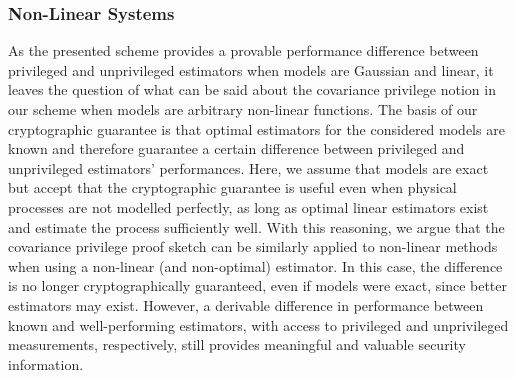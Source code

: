 
% 
% 

\subsubsection{Non-Linear Systems}
As the presented scheme provides a provable performance difference between privileged and unprivileged estimators when models are Gaussian and linear, it leaves the question of what can be said about the covariance privilege notion in our scheme when models are arbitrary non-linear functions. The basis of our cryptographic guarantee is that optimal estimators for the considered models are known and therefore guarantee a certain difference between privileged and unprivileged estimators' performances. Here, we assume that models are exact but accept that the cryptographic guarantee is useful even when physical processes are not modelled perfectly, as long as optimal linear estimators exist and estimate the process sufficiently well. With this reasoning, we argue that the covariance privilege proof sketch can be similarly applied to non-linear methods when using a non-linear (and non-optimal) estimator. In this case, the difference is no longer cryptographically guaranteed, even if models were exact, since better estimators may exist. However, a derivable difference in performance between known and well-performing estimators, with access to privileged and unprivileged measurements, respectively, still provides meaningful and valuable security information.

% 
% 
